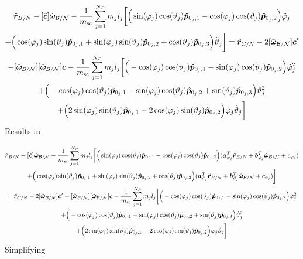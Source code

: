 \begin{multline}
	\ddot{\bm r}_{B/N}-[\tilde{\bm{c}}] \dot{\bm\omega}_{\cal B/N}-\frac{1}{m_{\text{sc}}}\sum_{j=1}^{N_{P}}m_j l_j \bigg[
	\Big(\sin(\varphi_j)\cos(\vartheta_j)\bm{\hat{p}}_{0_j,1}-\cos(\varphi_j)\cos(\vartheta_j)\bm{\hat{p}}_{0_j,2}\Big)\ddot{\varphi}_j \\+\Big(\cos(\varphi_j)\sin(\vartheta_j)\bm{\hat{p}}_{0_j,1}+\sin(\varphi_j)\sin(\vartheta_j)\bm{\hat{p}}_{0_j,2}+\cos(\vartheta_j)\bm{\hat{p}}_{0_j,3}\Big)\ddot{\vartheta}_j
	\bigg]= \ddot{\bm r}_{C/N} 	- 2[\tilde{\bm\omega}_{\cal B/N}] \bm c'
	\\-[\tilde{\bm\omega}_{\cal B/N}][\tilde{\bm\omega}_{\cal B/N}]\bm{c}
	-\frac{1}{m_{\text{sc}}}\sum_{j=1}^{N_{P}}m_j l_j \bigg[
	\Big(-\cos(\varphi_j)\cos(\vartheta_j)\bm{\hat{p}}_{0_j,1}-\sin(\varphi_j)\cos(\vartheta_j)\bm{\hat{p}}_{0_j,2}\Big)\dot{\varphi}_j^2
	\\+\Big(-\cos(\varphi_j)\cos(\vartheta_j)\bm{\hat{p}}_{0_j,1}-\sin(\varphi_j)\cos(\vartheta_j)\bm{\hat{p}}_{0_j,2}+\sin(\vartheta_j)\bm{\hat{p}}_{0_j,3} \Big)\dot{\vartheta}_j^2 \\+
	\Big(2\sin(\varphi_j)\sin(\vartheta_j)\bm{\hat{p}}_{0_j,1} -2\cos(\varphi_j)\sin(\vartheta_j)\bm{\hat{p}}_{0_j,2}\Big)\dot{\varphi}_j\dot{\vartheta}_j
	\bigg]
	\label{eq:Rbddot4_bis}
\end{multline}
Results in

\begin{multline}
	\ddot{\bm r}_{B/N}-[\tilde{\bm{c}}] \dot{\bm\omega}_{\cal B/N}-\frac{1}{m_{\text{sc}}}\sum_{j=1}^{N_{P}}m_j l_j \bigg[
	\Big(\sin(\varphi_j)\cos(\vartheta_j)\bm{\hat{p}}_{0_j,1}-\cos(\varphi_j)\cos(\vartheta_j)\bm{\hat{p}}_{0_j,2}\Big)(\bm a_{\varphi_j}^T \ddot{\bm{r}}_{B/N} + \bm b_{\varphi_j}^T \dot{\bm\omega}_{\cal B/N} +c_{\varphi_j}) \\ +\Big(\cos(\varphi_j)\sin(\vartheta_j)\bm{\hat{p}}_{0_j,1}+\sin(\varphi_j)\sin(\vartheta_j)\bm{\hat{p}}_{0_j,2}+\cos(\vartheta_j)\bm{\hat{p}}_{0_j,3}\Big)(\bm a_{\vartheta_j}^T \ddot{\bm r}_{B/N} + \bm b_{\vartheta_j}^T \dot{\bm\omega}_{\cal B/N} + c_{\vartheta_j})
	\bigg]
	\\= \ddot{\bm r}_{C/N} 	- 2[\tilde{\bm\omega}_{\cal B/N}] \bm c'
	-[\tilde{\bm\omega}_{\cal B/N}][\tilde{\bm\omega}_{\cal B/N}]\bm{c}
	-\frac{1}{m_{\text{sc}}}\sum_{j=1}^{N_{P}}m_j l_j \bigg[
	\Big(-\cos(\varphi_j)\cos(\vartheta_j)\bm{\hat{p}}_{0_j,1}-\sin(\varphi_j)\cos(\vartheta_j)\bm{\hat{p}}_{0_j,2}\Big)\dot{\varphi}_j^2\\
	+\Big(-\cos(\varphi_j)\cos(\vartheta_j)\bm{\hat{p}}_{0_j,1}-\sin(\varphi_j)\cos(\vartheta_j)\bm{\hat{p}}_{0_j,2}+\sin(\vartheta_j)\bm{\hat{p}}_{0_j,3} \Big)\dot{\vartheta}_j^2\\ +
	\Big(2\sin(\varphi_j)\sin(\vartheta_j)\bm{\hat{p}}_{0_j,1} -2\cos(\varphi_j)\sin(\vartheta_j)\bm{\hat{p}}_{0_j,2}\Big)\dot{\varphi}_j\dot{\vartheta}_j
	\bigg]
	\label{eq:Rbddot5}
\end{multline}
Simplifying

